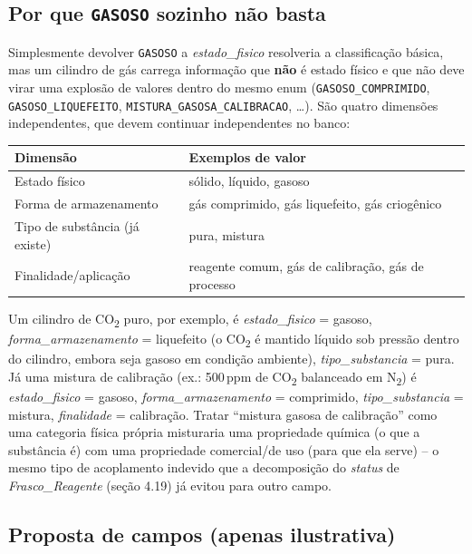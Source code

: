 \documentclass[12pt,a4paper]{article}
\begin{document}
\subsection{Por que \texttt{GASOSO} sozinho não basta}

Simplesmente devolver \texttt{GASOSO} a \textit{estado\_fisico} resolveria a classificação básica, mas um cilindro de gás carrega informação que \textbf{não} é estado físico e que não deve virar uma explosão de valores dentro do mesmo enum (\texttt{GASOSO\_COMPRIMIDO}, \texttt{GASOSO\_LIQUEFEITO}, \texttt{MISTURA\_GASOSA\_CALIBRACAO}, \ldots). São quatro dimensões independentes, que devem continuar independentes no banco:

\begin{center}
\begin{tabular}{p{}p{}}
\toprule
\textbf{Dimensão} & \textbf{Exemplos de valor} \\
\midrule
Estado físico & sólido, líquido, gasoso \\
Forma de armazenamento & gás comprimido, gás liquefeito, gás criogênico \\
Tipo de substância (já existe) & pura, mistura \\
Finalidade/aplicação & reagente comum, gás de calibração, gás de processo \\
\bottomrule
\end{tabular}
\end{center}

Um cilindro de CO\textsubscript{2} puro, por exemplo, é \textit{estado\_fisico} = gasoso, \textit{forma\_armazenamento} = liquefeito (o CO\textsubscript{2} é mantido líquido sob pressão dentro do cilindro, embora seja gasoso em condição ambiente), \textit{tipo\_substancia} = pura. Já uma mistura de calibração (ex.: 500\,ppm de CO\textsubscript{2} balanceado em N\textsubscript{2}) é \textit{estado\_fisico} = gasoso, \textit{forma\_armazenamento} = comprimido, \textit{tipo\_substancia} = mistura, \textit{finalidade} = calibração. Tratar ``mistura gasosa de calibração'' como uma categoria física própria misturaria uma propriedade química (o que a substância é) com uma propriedade comercial/de uso (para que ela serve) -- o mesmo tipo de acoplamento indevido que a decomposição do \textit{status} de \textit{Frasco\_Reagente} (seção 4.19) já evitou para outro campo.

\subsection{Proposta de campos (apenas ilustrativa)}
\end{document}
